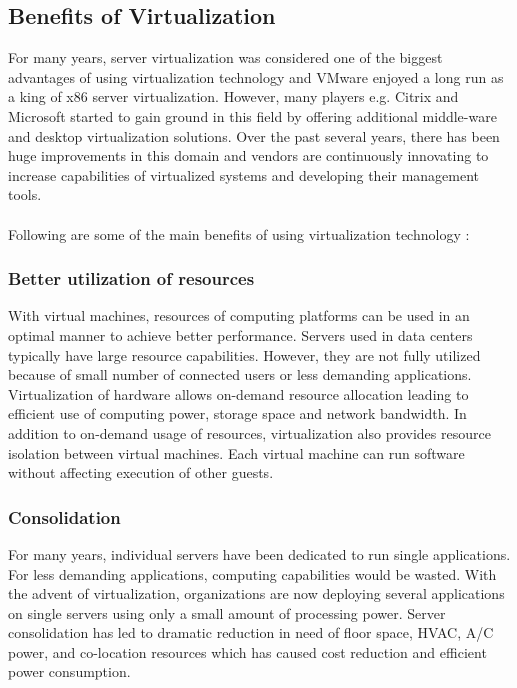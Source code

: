 \subsection{Benefits of Virtualization\label{sec:uses}} 
For many years, server virtualization was considered one of the biggest advantages of using virtualization technology and VMware enjoyed a long run as a king of x86 server virtualization. However, many players e.g. Citrix and Microsoft started to gain ground in this field by offering additional middle-ware and desktop virtualization solutions. Over the past several years, there has been huge improvements in this domain and vendors are continuously innovating to increase capabilities of virtualized systems and developing their management tools.\\
\\
Following are some of the main benefits of using virtualization technology \cite{reasonstousevirtualization}:

\subsubsection{Better utilization of resources \label{sec:resource optimization}}
With virtual machines, resources of computing platforms can be used in an optimal manner to achieve better performance. Servers used in data centers typically have large resource capabilities. However, they are not fully utilized because of small number of connected users or less demanding applications. Virtualization of hardware allows on-demand resource allocation leading to efficient use of computing power, storage space and network bandwidth. In addition to on-demand usage of resources, virtualization also provides resource isolation between virtual machines. Each virtual machine can run software without affecting execution of other guests. 

\subsubsection{Consolidation \label{sec:Consolidation}}
For many years, individual servers have been dedicated to run single applications. For less demanding applications, computing capabilities would be wasted. With the advent of virtualization, organizations are now deploying several applications on single servers using only a small amount of processing power. Server consolidation has led to dramatic reduction in need of floor space, HVAC, A/C power, and co-location resources which has caused cost reduction and efficient power consumption.

